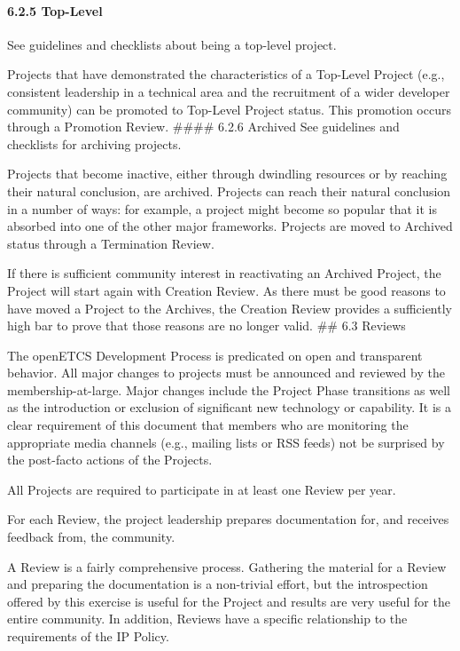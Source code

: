 \paragraph{6.2.5 Top-Level}\label{top-level}

See guidelines and checklists about being a top-level project.

Projects that have demonstrated the characteristics of a Top-Level
Project (e.g., consistent leadership in a technical area and the
recruitment of a wider developer community) can be promoted to Top-Level
Project status. This promotion occurs through a Promotion Review.
\#\#\#\# 6.2.6 Archived See guidelines and checklists for archiving
projects.

Projects that become inactive, either through dwindling resources or by
reaching their natural conclusion, are archived. Projects can reach
their natural conclusion in a number of ways: for example, a project
might become so popular that it is absorbed into one of the other major
frameworks. Projects are moved to Archived status through a Termination
Review.

If there is sufficient community interest in reactivating an Archived
Project, the Project will start again with Creation Review. As there
must be good reasons to have moved a Project to the Archives, the
Creation Review provides a sufficiently high bar to prove that those
reasons are no longer valid. \#\# 6.3 Reviews

The openETCS Development Process is predicated on open and transparent
behavior. All major changes to projects must be announced and reviewed
by the membership-at-large. Major changes include the Project Phase
transitions as well as the introduction or exclusion of significant new
technology or capability. It is a clear requirement of this document
that members who are monitoring the appropriate media channels (e.g.,
mailing lists or RSS feeds) not be surprised by the post-facto actions
of the Projects.

All Projects are required to participate in at least one Review per
year.

For each Review, the project leadership prepares documentation for, and
receives feedback from, the community.

A Review is a fairly comprehensive process. Gathering the material for a
Review and preparing the documentation is a non-trivial effort, but the
introspection offered by this exercise is useful for the Project and
results are very useful for the entire community. In addition, Reviews
have a specific relationship to the requirements of the IP Policy.

